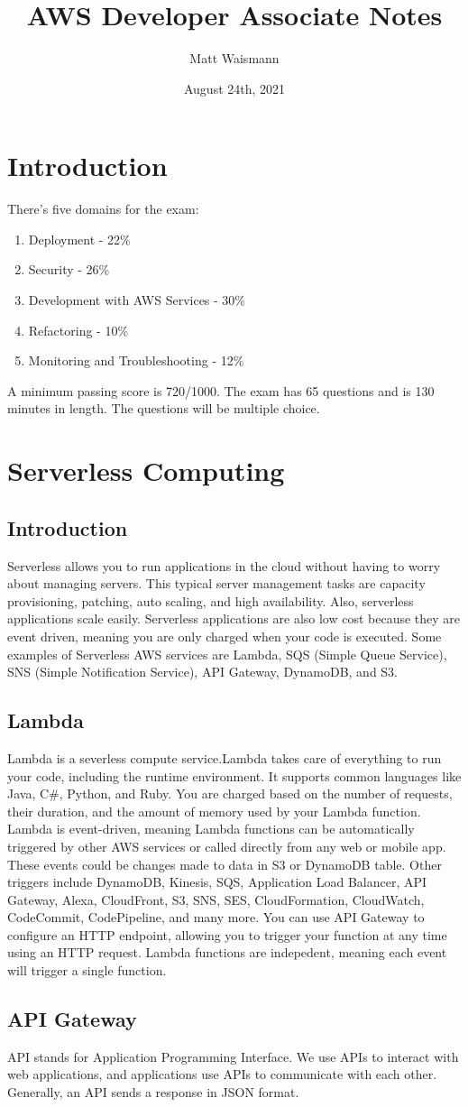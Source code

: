 \documentclass{article}%
\title{AWS Developer Associate Notes}
\date{August 24th, 2021}
\author{Matt Waismann}
\begin{document}
\maketitle
\section{Introduction}
There's five domains for the exam:
\begin{enumerate}
    \item Deployment - 22\%
    \item Security - 26\%
    \item Development with AWS Services - 30\%
    \item Refactoring - 10\%
    \item Monitoring and Troubleshooting - 12\%
\end{enumerate}

A minimum passing score is 720/1000. The exam has 65 questions and is 130 minutes in length. The questions will be multiple choice.

\section{Serverless Computing}
\subsection{Introduction} Serverless allows you to run applications in the cloud without having to worry about managing servers. This typical server management tasks are capacity provisioning, patching, auto scaling, and high availability. Also, serverless applications scale easily.
Serverless applications are also low cost because they are event driven, meaning you are only charged when your code is executed.
Some examples of Serverless AWS services are Lambda, SQS (Simple Queue Service), SNS (Simple Notification Service), API Gateway, DynamoDB, and S3. 
\subsection{Lambda}
Lambda is a severless compute service.Lambda takes care of everything to run your code, including the runtime environment. It supports common languages like Java, C\#, Python, and Ruby. You are charged based on the number of requests, their duration, and the amount of memory used by your Lambda function. Lambda is event-driven, meaning Lambda functions can be automatically triggered by other AWS services or called directly from any web or mobile app. These events could be changes made to data in S3 or DynamoDB table. Other triggers include DynamoDB, Kinesis, SQS, Application Load Balancer, API Gateway, Alexa, CloudFront, S3, SNS, SES, CloudFormation, CloudWatch, CodeCommit, CodePipeline, and many more. You can use API Gateway to configure an HTTP endpoint, allowing you to trigger your function at any time using an HTTP request. 
Lambda functions are indepedent, meaning each event will trigger a single function. 

\subsection{API Gateway}
API stands for Application Programming Interface. We use APIs to interact with web applications, and applications use APIs to communicate with each other. Generally, an API sends a response in JSON format. 
\end{document}
